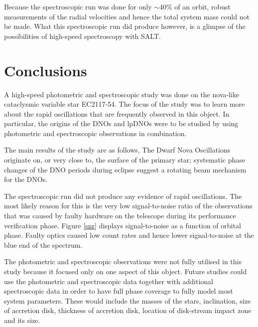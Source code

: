 Because the spectroscopic run was done for only $\sim$40\% of an orbit, robust measurements of the radial velocities and hence the total system mass could not be made. What this spectroscopic run did produce however, is a glimpse of the possibilities of high-speed spectroscopy with SALT. 

\chapter{Conclusions}
A high-speed photometric and spectroscopic study was done on the nova-like cataclysmic variable star EC2117-54. The focus of the study was to learn more about the rapid oscillations that are frequently observed in this object. In particular, the origins of the DNOs and lpDNOs were to be studied by using photometric and spectroscopic observations in combination.
 
The main results of the study are as follows, The Dwarf Nova Oscillations originate on, or very close to, the surface of the primary star; systematic phase changes of the DNO periods during eclipse suggest a rotating beam mechanism for the DNOs.

The spectroscopic run did not produce any evidence of rapid oscillations. The most likely reason for this is the very low signal-to-noise ratio of the observations that was caused by faulty hardware on the telescope during its performance verification phase. Figure \ref{snr} displays signal-to-noise as a function of orbital phase. Faulty optics caused low count rates and hence lower signal-to-noise at the blue end of the spectrum.

The photometric and spectroscopic observations were not fully utilised in this study because it focused only on one aspect of this object. Future studies could use the photometric and spectroscopic data together with additional spectroscopic data in order to have full phase coverage to fully model most system parameters. These would include the masses of the stars, inclination, size of accretion disk, thickness of accretion disk, location of disk-stream impact zone and its size.